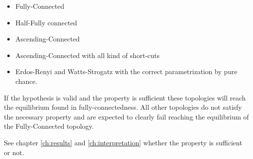 \documentclass[Bachelorarbeit.tex]{subfiles}
\begin{document}
\begin{itemize}
\item Fully-Connected
\item Half-Fully connected
\item Ascending-Connected
\item Ascending-Connected with all kind of short-cuts
\item Erdos-Renyi and Watts-Strogatz with the correct parametrization by pure chance.
\end{itemize}

If the hypothesis is valid and the property is sufficient these topologies will reach the equilibrium found in fully-connectedness. All other topologies do not satisfy the necessary property and are expected to clearly fail reaching the equilibrium of the Fully-Connected topology.

\medskip

See chapter \ref{ch:results} and \ref{ch:interpretation} whether the property is sufficient or not. 
\end{document}
